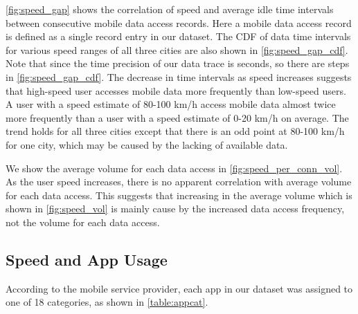 \autoref{fig:speed_gap} shows the correlation of speed and average idle time intervals between consecutive mobile data access records. Here a mobile data access record is defined as a single record entry in our dataset. The CDF of data time intervals for various speed ranges of all three cities are also shown in \autoref{fig:speed_gap_cdf}. Note that since the time precision of our data trace is seconds, so there are steps in \autoref{fig:speed_gap_cdf}. The decrease in time intervals as speed increases suggests that high-speed user accesses mobile data more frequently than low-speed users. A user with a speed estimate of 80-100 km/h access mobile data almost twice more frequently than a user with a speed estimate of 0-20 km/h on average. The trend holds for all three cities except that there is an odd point at 80-100 km/h for one city, which may be caused by the lacking of available data.

We show the average volume for each data access in \autoref{fig:speed_per_conn_vol}. As the user speed increases, there is no apparent correlation with average volume for each data access. This suggests that increasing in the average volume which is shown in \autoref{fig:speed_vol} is mainly cause by the increased data access frequency, not the volume for each data access.

\subsection{Speed and App Usage}


According to the mobile service provider, each app in our dataset was assigned to one of 18 categories, as shown in \autoref{table:appcat}. 

